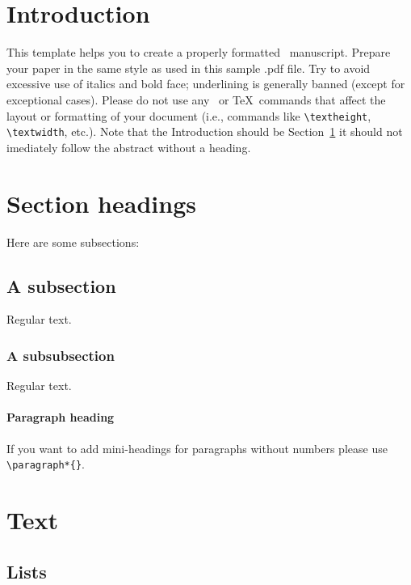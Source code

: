 \documentclass[qe,nameyear,draft]{econsocart}
\theoremstyle{plain}
\theoremstyle{remark}
\begin{document}
\section{Introduction}\label{s1}

This template helps you to create a properly formatted \LaTeXe\ manuscript.
Prepare your paper in the same style as used in this sample .pdf file.
Try to avoid excessive use of italics and bold face; underlining is generally banned (except for exceptional cases). Please do not use any \LaTeXe\ or \TeX\ commands that affect the layout or formatting of your document (i.e., commands like \verb|\textheight|, \verb|\textwidth|, etc.). Note that the Introduction should be Section~\ref{s1} it should not imediately follow the abstract without a heading.

\section{Section headings}
Here are some subsections:
\subsection{A subsection}
Regular text.
\subsubsection{A subsubsection}
Regular text.

\paragraph*{Paragraph heading} If you want to add mini-headings for paragraphs without numbers please use \verb|\paragraph*{}|.

\section{Text}

\subsection{Lists}
\end{document}

